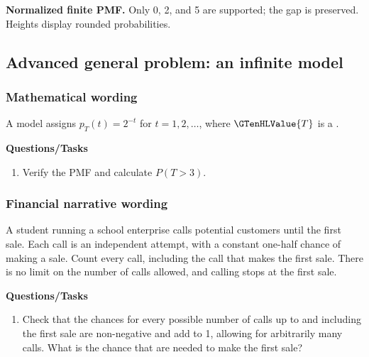 \par\noindent \begin{minipage}[t]{.485\linewidth}
\centering
{}
\par\small \textbf{Normalized finite PMF.} Only 0, 2, and 5 are supported; the gap is preserved. Heights display rounded probabilities.
\end{minipage}\par\medskip

\subsection{Advanced general problem: an infinite model}
\subsubsection*{Mathematical wording}
A model assigns $p_T(t)=2^{-t}$ for $t=1,2,\ldots$, where $\GTenHLValue{T}$ is a .

\textbf{Questions/Tasks}
\begin{enumerate}
\item Verify the PMF and calculate $P(T>3)$.
\end{enumerate}
\subsubsection*{Financial narrative wording}
A student running a school enterprise calls potential customers until the first sale. Each call is an independent attempt, with a constant one-half chance of making a sale. Count every call, including the call that makes the first sale. There is no limit on the number of calls allowed, and calling stops at the first sale.

\textbf{Questions/Tasks}
\begin{enumerate}
\item Check that the chances for every possible number of calls up to and including the first sale are non-negative and add to 1, allowing for arbitrarily many calls. What is the chance that  are needed to make the first sale?
\end{enumerate}
